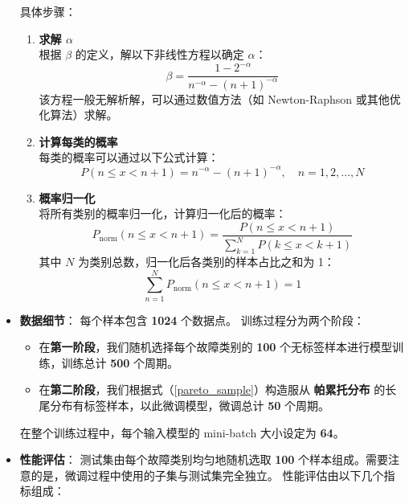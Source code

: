 \documentclass[master]{thesis-uestc}
\begin{document}
\begin{itemize}
    具体步骤：

    \begin{enumerate}
        \item \textbf{求解 $\alpha$} \\
        根据 $\beta$ 的定义，解以下非线性方程以确定 $\alpha$：
        \begin{equation}
        \beta = \frac{1 - 2^{-\alpha}}{n^{-\alpha} - (n+1)^{-\alpha}}
        \end{equation}
        该方程一般无解析解，可以通过数值方法（如 Newton-Raphson 或其他优化算法）求解。

        \item \textbf{计算每类的概率} \\
        每类的概率可以通过以下公式计算：
        \begin{equation}
        P(n \leq x < n+1) = n^{-\alpha} - (n+1)^{-\alpha}, \quad n = 1, 2, \dots, N
        \end{equation}

        \item \textbf{概率归一化} \\
        将所有类别的概率归一化，计算归一化后的概率：
        \begin{equation}
        P_{\text{norm}}(n \leq x < n+1) = \frac{P(n \leq x < n+1)}{\sum_{k=1}^N P(k \leq x < k+1)}
        \label{pareto_sample}
        \end{equation}
        其中 $N$ 为类别总数，归一化后各类别的样本占比之和为 1：
        \begin{equation}
        \sum_{n=1}^N P_{\text{norm}}(n \leq x < n+1) = 1
        \end{equation}
    \end{enumerate}
    \item \textbf{数据细节}：
      每个样本包含 \textbf{1024} 个数据点。
      训练过程分为两个阶段：
      \begin{itemize}
          \item 在\textbf{第一阶段}，我们随机选择每个故障类别的 \textbf{100} 个无标签样本进行模型训练，训练总计 \textbf{500} 个周期。
          \item 在\textbf{第二阶段}，我们根据式（\ref{pareto_sample}）构造服从 \textbf{帕累托分布} 的长尾分布有标签样本，以此微调模型，微调总计 \textbf{50} 个周期。
      \end{itemize}
      在整个训练过程中，每个输入模型的 mini-batch 大小设定为 \textbf{64}。
      
      \item \textbf{性能评估}：  
      测试集由每个故障类别均匀地随机选取 \textbf{100} 个样本组成。需要注意的是，微调过程中使用的子集与测试集完全独立。  
      性能评估由以下几个指标组成：


\end{itemize}
\end{document}
